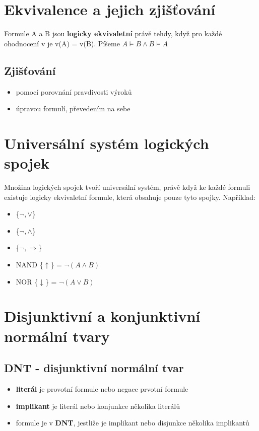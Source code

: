 \documentclass{szzclass}
\begin{document}
\section{Ekvivalence a jejich zjišťování}
Formule A a B jsou \textbf{logicky ekvivaletní} právě tehdy, když pro každé ohodnocení v je v(A) = v(B). Píšeme $A \models B \wedge B \models A$

\subsection{Zjišťování}
\begin{itemize}
	\item pomocí porovnání pravdivosti výroků
	\item úpravou formulí, převedením na sebe
\end{itemize}

\section{Universální systém logických spojek}
Množina logických spojek tvoří universální systém, právě když ke každé formuli existuje logicky ekvivaletní formule, která obsahuje pouze
tyto spojky. Například:
\begin{itemize}
	\item \{$\neg, \vee$\}
	\item \{$\neg, \wedge $\}
	\item \{$\neg, \Rightarrow$\}
	\item NAND \{$\uparrow$\} = $\neg(A \wedge B)$
	\item NOR \{$\downarrow$\} = $\neg(A \vee B)$
\end{itemize}
\section{Disjunktivní a konjunktivní normální tvary}
\subsection{DNT - disjunktivní normální tvar}
\begin{itemize}
	\item \textbf{literál} je provotní formule nebo negace prvotní formule
	\item \textbf{implikant} je literál nebo konjunkce několika literálů
	\item formule je v \textbf{DNT}, jestliže je implikant nebo disjunkce několika implikantů 
\end{itemize}
\end{document}

